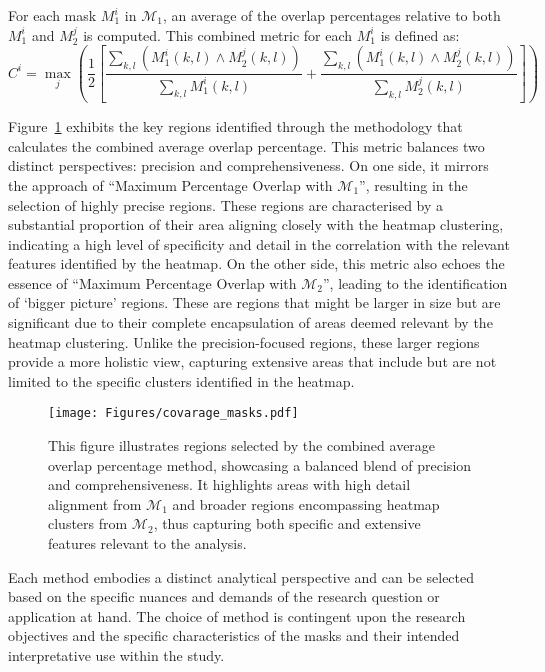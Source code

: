 For each mask \( M_1^i \) in \(\mathcal{M}_1\), an average of the overlap percentages relative to both \( M_1^i \) and \( M_2^j \) is computed. This combined metric for each \( M_1^i \) is defined as:
\begin{equation*}
C^i = \max_j \left( \frac{1}{2} \left[ \frac{\sum_{k, l} \left( M_1^i(k, l) \land M_2^j(k, l) \right)}{\sum_{k, l} M_1^i(k, l)} + \frac{\sum_{k, l} \left( M_1^i(k, l) \land M_2^j(k, l) \right)}{\sum_{k, l} M_2^j(k, l)} \right] \right)
\end{equation*}

Figure~\ref{Fig:covarage_masks} exhibits the key regions identified through the methodology that calculates the combined average overlap percentage. This metric balances two distinct perspectives: precision and comprehensiveness. On one side, it mirrors the approach of ``Maximum Percentage Overlap with \(\mathcal{M}_1\)'', resulting in the selection of highly precise regions. These regions are characterised by a substantial proportion of their area aligning closely with the heatmap clustering, indicating a high level of specificity and detail in the correlation with the relevant features identified by the heatmap. On the other side, this metric also echoes the essence of ``Maximum Percentage Overlap with \(\mathcal{M}_2\)'', leading to the identification of `bigger picture' regions. These are regions that might be larger in size but are significant due to their complete encapsulation of areas deemed relevant by the heatmap clustering. Unlike the precision-focused regions, these larger regions provide a more holistic view, capturing extensive areas that include but are not limited to the specific clusters identified in the heatmap.

\begin{figure}[ht!]
\begin{center}
\texttt{[image: Figures/covarage\_masks.pdf]}
\end{center}
\caption{This figure illustrates regions selected by the combined average overlap percentage method, showcasing a balanced blend of precision and comprehensiveness. It highlights areas with high detail alignment from \(\mathcal{M}_1\) and broader regions encompassing heatmap clusters from \(\mathcal{M}_2\), thus capturing both specific and extensive features relevant to the analysis.}
\label{Fig:covarage_masks}
\end{figure} 

Each method embodies a distinct analytical perspective and can be selected based on the specific nuances and demands of the research question or application at hand. The choice of method is contingent upon the research objectives and the specific characteristics of the masks and their intended interpretative use within the study.


